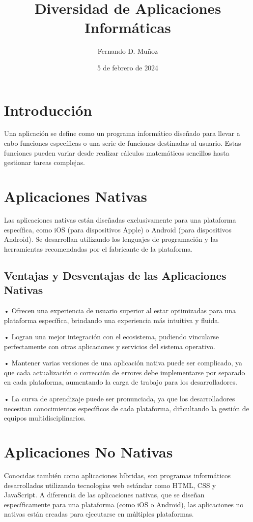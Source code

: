 \documentclass{article}
\title{Diversidad de Aplicaciones Informáticas}
\author{Fernando D. Muñoz}
\date{5 de febrero de 2024}
\begin{document}
 
	
	\begin{multicols}{2}
		\section{Introducción}
		Una aplicación se define como un programa informático diseñado para llevar a cabo funciones específicas o una serie de funciones destinadas al usuario. Estas funciones pueden variar desde realizar cálculos matemáticos sencillos hasta gestionar tareas complejas.
		
		\section{Aplicaciones Nativas}
		Las aplicaciones nativas están diseñadas exclusivamente para una plataforma específica, como iOS (para dispositivos Apple) o Android (para dispositivos Android). Se desarrollan utilizando los lenguajes de programación y las herramientas recomendadas por el fabricante de la plataforma.
		
		\subsection{Ventajas y Desventajas de las Aplicaciones Nativas}
				
		• Ofrecen una experiencia de usuario superior al estar optimizadas para una plataforma específica, brindando una experiencia más intuitiva y fluida.
		
		• Logran una mejor integración con el ecosistema, pudiendo vincularse perfectamente con otras aplicaciones y servicios del sistema operativo.
		
		• Mantener varias versiones de una aplicación nativa puede ser complicado, ya que cada actualización o corrección de errores debe implementarse por separado en cada plataforma, aumentando la carga de trabajo para los desarrolladores.
		
		• La curva de aprendizaje puede ser pronunciada, ya que los desarrolladores necesitan conocimientos específicos de cada plataforma, dificultando la gestión de equipos multidisciplinarios.
		
	
		\section{Aplicaciones No Nativas}
		Conocidas también como aplicaciones híbridas, son programas informáticos desarrollados utilizando tecnologías web estándar como HTML, CSS y JavaScript. A diferencia de las aplicaciones nativas, que se diseñan específicamente para una plataforma (como iOS o Android), las aplicaciones no nativas están creadas para ejecutarse en múltiples plataformas.
		

\end{multicols}
\end{document}
